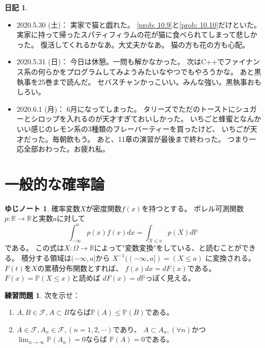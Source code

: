\documentclass[uplatex]{jsarticle}
\theoremstyle{definition}
\newtheorem{prob}[prob]{練習問題}
\newtheorem*{rrem*}{ゆじノート}
\newtheorem*{nikki*}{日記}
\def\R{\mathbb{R}}
\def\P{\mathbb{P}}
\def\mcF{\mathcal{F}}
\begin{document}
\begin{nikki*}
\begin{itemize}
    {ネットに落ちてる答え}が違うんじゃねっておもって
    自分の答えをそのまま書いといた。
    計算はだるいから途中まで。
    解いたのは\autoref{prob: 10.8}まで。
    結局5月中に終わるか終わらないかって感じだなあ。
    すぐだったなあ。これ終わったら何しようかなあ...
    \item
    2020.5.30 (土)：
    実家で猫と戯れた。
    \autoref{prob: 10.9}と\autoref{prob: 10.10}だけといた。
    実家に持って帰ったスパティフィラムの花が猫に食べられてしまって悲しかった。
    復活してくれるかなあ。大丈夫かなあ。
    猫の方も花の方も心配。
    \item
    2020.5.31 (日)：
    今日は休憩。一問も解かなかった。
    次はC++でファイナンス系の何らかをプログラムしてみようみたいなやつでもやろうかな。
    あと黒執事を25巻まで読んだ。
    セバスチャンかっこいい。みんな強い。黒執事おもしろい。
    \item
    2020.6.1 (月)：
    6月になってしまった。
    タリーズでただのトーストにシュガーとシロップを入れるのが天才すぎておいしかった。
    いちごと蜂蜜となんかいい感じのレモン系の3種類のフレーバーティーを買ったけど、
    いちごが天才だった。毎朝飲もう。
    あと、11章の演習が最後まで終わった。
    つまり一応全部おわった。お疲れ私。
  \end{itemize}
\end{nikki*}





\newpage

\section{一般的な確率論}\label{section: 1}


\begin{rrem*}
  確率変数\(X\)が密度関数\(f(x)\)を持つとする。
  ボレル可測関数\(p:\R\to \R\)と実数\(a\)に対して
  \[
  \int_{-\infty}^a p(x)f(x)dx = \int_{X\leq a}p(X)d\P
  \]
  である。
  この式は\(X:\Omega \to \R\)によって"変数変換"をしている、と読むことができる。
  積分する領域は\((-\infty ,a]\)から
  \(X^{-1}((-\infty ,a]) = (X\leq a)\)
  に変換される。
  \(F(t)\)を\(X\)の累積分布関数とすれば、
  \(f(x)dx = dF(x)\)である。
  \(F(x) = \P(X\leq x)\)と読めば
  \(dF(x) = d\P\)っぽく見える。
\end{rrem*}



\begin{prob}\label{prob: 1.1}
  次を示せ：
  \begin{enumerate}
    \item \label{enumi: 1.1-1}
    \(A,B \in \mcF, A\subset B\)ならば\(\P(A)\leq \P(B)\)である。
    \item \label{enumi: 1.1-2}
    \(A\in \mcF, A_n\in \mcF , (n=1,2,\cdots)\)であり、
    \(A\subset A_n , (\forall n)\)かつ\(\lim_{n\to\infty}\P(A_n)=0\)ならば
    \(\P(A)=0\)である。
  \end{enumerate}
\end{prob}
\end{document}
